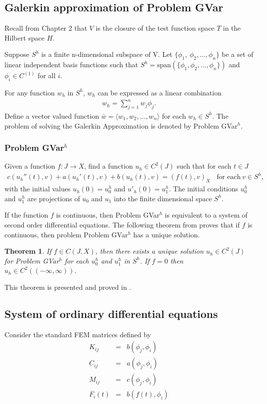 \documentclass[../../main.tex]{subfiles}
\begin{document}
\subsection{Galerkin approximation of Problem GVar}
Recall from Chapter 2 that $V$ is the closure of the test function space $T$ in the Hilbert space $H$.

Suppose $S^h$ is a finite n-dimensional subspace of V. Let $\{\phi_1, \ \phi_2,...,\phi_n\}$ be a set of linear independent basis functions such that $S^h = \textrm{span}(\{\phi_1, \phi_2, ..., \phi_n \})$ and $\phi_i \in C^{(1)}$ for all $i$.

For any function $w_h$ in $S^h$, $w_h$ can be expressed as a linear combination
\begin{eqnarray*}
	w_h = \sum_{j=1}^n w_j \phi_j.
\end{eqnarray*} Define a vector valued function $\bar{w} = \langle w_1,w_2,...,w_n \rangle$ for each $w_h \in S^h$. The problem of solving the Galerkin Approximation is denoted by Problem GVar$^h$.

\subsubsection*{Problem GVar$^h$}
Given a function $f: J \rightarrow X$, find a function $u_h \in C^2(J)$ such that for each $t\in J$
\begin{eqnarray}
	c(u_h''(t),v)+a(u_h'(t),v)+b(u_h(t),v)= (f(t),v)_{X} \ \ \ \ \textrm{for each} \ v \in S^h, \label{DC_E2}
\end{eqnarray}
with the initial values $u_h(0)=u^h_{0}$ and $u'_h(0)=u^h_{1}$. The initial conditions $u^h_{0}$ and $u^h_{1}$ are projections of $u_0$ and $u_1$ into the finite dimensional space $S^h$.

If the function $f$ is continuous, then Problem GVar$^h$ is equivalent to a system of second order differential equations. The following theorem from \cite{BV13} proves that if $f$ is continuous, then problem Problem GVar$^h$ has a unique solution.

\newtheorem{DC_Thm2}{Theorem}
\begin{DC_Thm2} \label{DC_THM2}
	If $f \in C(J,X)$, then there exists a unique solution $u_h \in C^2(J)$ for Problem GVar$^h$ for each $u_0^h$ and $u_1^h$ in $S^h$. If $f = 0$ then $u_h \in C^2((-\infty, \infty))$.
\end{DC_Thm2}

This theorem is presented and proved in \cite{BV13}.

\subsection{System of ordinary differential equations}
Consider the standard FEM matrices defined by
\begin{eqnarray*}
	K_{ij} & = & b(\phi_j, \phi_i)\\
	C_{ij} & = & a(\phi_j, \phi_i)\\
	M_{ij} & = & c(\phi_j, \phi_i)\\
	F_{i}(t) & = & b(f(t), \phi_i)
\end{eqnarray*}
\end{document}
